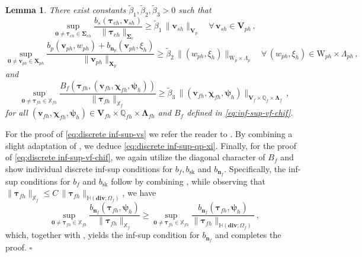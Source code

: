 \documentclass[11pt]{article}
\numberwithin{equation}{section}
\newcommand{\bLambda}{{\boldsymbol\Lambda}}
\newcommand{\bSigma}{{\boldsymbol\Sigma}}
\newcommand{\bpsi}{{\boldsymbol\psi}}
\newcommand{\btau}{{\boldsymbol\tau}}
\newcommand{\bchi}{{\boldsymbol\chi}}
\newcommand{\bv}{{\mathbf{v}}}
\newcommand{\bn}{{\mathbf{n}}}
\newcommand{\0}{{\mathbf{0}}}
\def\bX{\mathbf{X}}
\def\bV{\mathbf{V}}
\newcommand\bbQ{\mathbb{Q}}
\newcommand\bbH{\mathbb{H}}
\newcommand\bbX{\mathbb{X}}
\def\W{\mathrm{W}}
\def\bdiv{\mathbf{div}}
\def\sk{\mathrm{sk}}
\def\wt{\widetilde}
\newtheorem{lem}[thm]{Lemma}
\newenvironment{proof}{\noindent{\it Proof.}}{\hfill$\square$}
\numberwithin{equation}{section}
\begin{document}
\begin{lem}\label{lem: discrete inf-sup}
There exist constants $\wt{\beta}_1, \wt{\beta}_2, \wt{\beta}_3 > 0$ such that
\begin{equation}\label{eq:discrete inf-sup-vs}
\sup_{\0\neq \btau_{eh}\in \bSigma_{eh}} \frac{b_s(\btau_{eh},\bv_{sh})}{\|\btau_{eh}\|_{\bSigma_{e}}} 
\geq \wt{\beta}_1\,\|\bv_{sh}\|_{\bV_{p}} \quad \forall\,\bv_{sh}\in \bV_{ph} \,,
\end{equation}
%
\begin{equation}\label{eq:discrete inf-sup-qp-xi}
\sup_{\0\neq \bv_{ph}\in \bX_{ph}} \frac{b_p(\bv_{ph},w_{ph}) + b_{\bn_p}(\bv_{ph},\xi_{h})}{\|\bv_{ph}\|_{\bX_{p}}} 
\geq \wt{\beta}_2\,\|(w_{ph},\xi_{h})\|_{\W_{p}\times \Lambda_{p}} \quad \forall\,(w_{ph},\xi_{h})\in \W_{ph}\times \Lambda_{ph} \,,
\end{equation}
and 
\begin{equation}\label{eq:discrete inf-sup-vf-chif}
\sup_{\0\neq \btau_{fh}\in \bbX_{fh}} \frac{B_f(\btau_{fh},(\bv_{fh},\bchi_{fh},\bpsi_{h}))}{\|\btau_{fh}\|_{\bbX_{f}}} 
\geq \wt{\beta}_3\,\|(\bv_{fh}, \bchi_{fh}, \bpsi_{h})\|_{\bV_{f}\times \bbQ_{f}\times \bLambda_{f}}\,,
\end{equation}
for all $(\bv_{fh},\bchi_{fh},\bpsi_{h})\in \bV_{fh}\times \bbQ_{fh}\times \bLambda_{fh}$ and $B_f$ defined in \eqref{eq:inf-sup-vf-chif}.
\end{lem}
%
\begin{proof}
For the proof of \eqref{eq:discrete inf-sup-vs} we refer the reader to \cite[eq. (5.18) in Theorem 5.1]{aeny2019}.
By combining a slight adaptation of \cite[eqs. (4.13) and (4.22)]{gos2011}, we deduce \eqref{eq:discrete inf-sup-qp-xi}. 
Finally, for the proof of \eqref{eq:discrete inf-sup-vf-chif}, we again utilize the diagonal character of $B_f$ and show individual discrete inf-sup conditions for $b_f, b_\sk$ and $b_{\bn_f}$. 
Specifically, the inf-sup conditions for $b_f$ and $b_\sk$ follow by combining \cite[eqs. (4.28) and (4.29) in Section 4.4.2]{gobs2021}, while observing that $\|\btau_{fh}\|_{\bbX_{f}} \leq C\,\|\btau_{fh}\|_{\bbH(\bdiv;\Omega_{f})}$, we have
\begin{equation*}
\sup_{\0\neq \btau_{fh}\in \bbX_{fh}} \frac{b_{\bn_f}(\btau_{fh},\bpsi_h)}{\|\btau_{fh}\|_{\bbX_{f}}}
\geq \sup_{\0\neq \btau_{fh}\in \bbX_{fh}} \frac{b_{\bn_f}(\btau_{fh},\bpsi_h)}{\|\btau_{fh}\|_{\bbH(\bdiv;\Omega_{f})}} \,,
\end{equation*}
which, together with \cite[eqs. (5.26)--(5.29)]{gmor2014}, yields the inf-sup condition for $b_{\bn_f}$ and completes the proof.
\end{proof}
\end{document}

